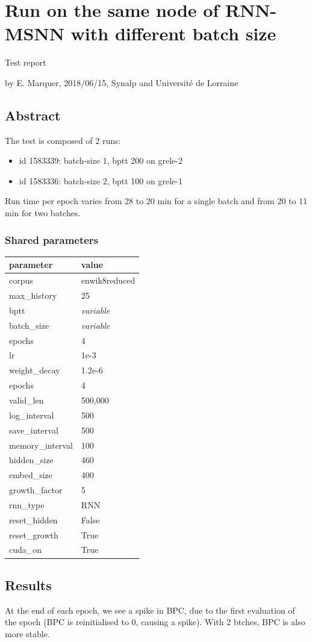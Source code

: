 \section*{Run on the same node of RNN-MSNN with different batch
size}

Test report

by E. Marquer, 2018/06/15, Synalp and Université de Lorraine

\subsection{Abstract}

The test is composed of 2 runs:
\begin{itemize}
\item id 1583339: batch-size 1, bptt 200 on
grele-2\item id 1583336: batch-size 2, bptt 100 on grele-1
\end{itemize}

Run time per epoch varies from 28 to 20 min for a single batch and from
20 to 11 min for two batches.

\subsubsection{Shared parameters}

\begin{longtable}[]{@{}ll@{}}
\hline
parameter & value\tabularnewline
\hline
\endhead
corpus & enwik8reduced\tabularnewline
max\_history & 25\tabularnewline
bptt & \emph{variable}\tabularnewline
batch\_size & \emph{variable}\tabularnewline
epochs & 4\tabularnewline
lr & 1e-3\tabularnewline
weight\_decay & 1.2e-6\tabularnewline
epochs & 4\tabularnewline
valid\_len & 500,000\tabularnewline
log\_interval & 500\tabularnewline
save\_interval & 500\tabularnewline
memory\_interval & 100\tabularnewline
hidden\_size & 460\tabularnewline
embed\_size & 400\tabularnewline
growth\_factor & 5\tabularnewline
rnn\_type & RNN\tabularnewline
reset\_hidden & False\tabularnewline
reset\_growth & True\tabularnewline
cuda\_on & True\tabularnewline
\hline
\end{longtable}

\subsection{Results}

At the end of each epoch, we see a spike in BPC, due to the first
evaluation of the epoch (BPC is reinitialised to 0, causing a spike).
With 2 btches, BPC is also more stable.

